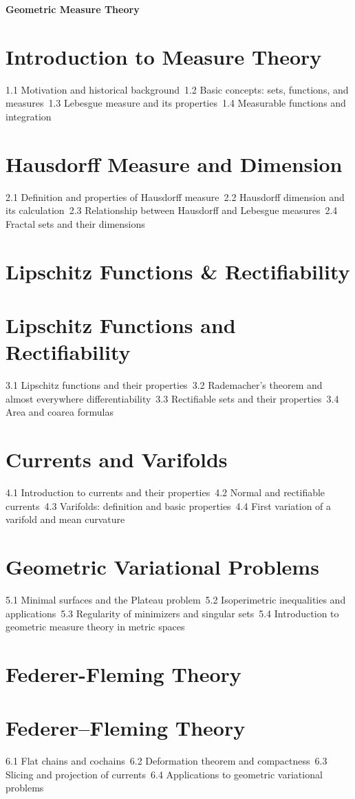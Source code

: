 {\LARGE \bf{Geometric Measure Theory}}
\section{Introduction to Measure Theory}
1.1 Motivation and historical background\
1.2 Basic concepts: sets, functions, and measures\
1.3 Lebesgue measure and its properties\
1.4 Measurable functions and integration\
\section{Hausdorff Measure and Dimension}
2.1 Definition and properties of Hausdorff measure\
2.2 Hausdorff dimension and its calculation\
2.3 Relationship between Hausdorff and Lebesgue measures\
2.4 Fractal sets and their dimensions\
\section{Lipschitz Functions \& Rectifiability}
\section{Lipschitz Functions and Rectifiability}
3.1 Lipschitz functions and their properties\
3.2 Rademacher's theorem and almost everywhere differentiability\
3.3 Rectifiable sets and their properties\
3.4 Area and coarea formulas\
\section{Currents and Varifolds}
4.1 Introduction to currents and their properties\
4.2 Normal and rectifiable currents\
4.3 Varifolds: definition and basic properties\
4.4 First variation of a varifold and mean curvature\
\section{Geometric Variational Problems}
5.1 Minimal surfaces and the Plateau problem\
5.2 Isoperimetric inequalities and applications\
5.3 Regularity of minimizers and singular sets\
5.4 Introduction to geometric measure theory in metric spaces\
\section{Federer-Fleming Theory}
\section{Federer–Fleming Theory}
6.1 Flat chains and cochains\
6.2 Deformation theorem and compactness\
6.3 Slicing and projection of currents\
6.4 Applications to geometric variational problems\
